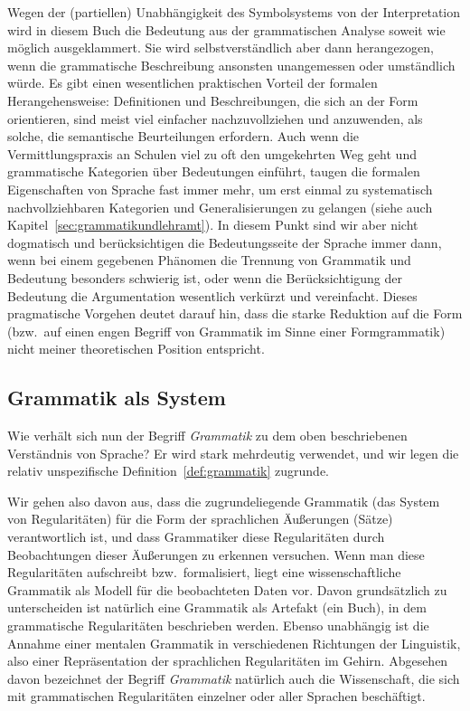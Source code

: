 Wegen der (partiellen) Unabhängigkeit des Symbolsystems von der Interpretation wird in diesem Buch die Bedeutung aus der grammatischen Analyse soweit wie möglich ausgeklammert.
Sie wird selbstverständlich aber dann herangezogen, wenn die grammatische Beschreibung ansonsten unangemessen oder umständlich würde.
Es gibt einen wesentlichen praktischen Vorteil der formalen Herangehensweise:
Definitionen und Beschreibungen, die sich an der Form orientieren, sind meist viel einfacher nachzuvollziehen und anzuwenden, als solche, die semantische Beurteilungen erfordern.
Auch wenn die Vermittlungspraxis an Schulen viel zu oft den umgekehrten Weg geht und grammatische Kategorien über Bedeutungen einführt, taugen die formalen Eigenschaften von Sprache fast immer mehr, um erst einmal zu systematisch nachvollziehbaren Kategorien und Generalisierungen zu gelangen (siehe auch Kapitel~\ref{sec:grammatikundlehramt}).
In diesem Punkt sind wir aber nicht dogmatisch und berücksichtigen die Bedeutungsseite der Sprache immer dann, wenn bei einem gegebenen Phänomen die Trennung von Grammatik und Bedeutung besonders schwierig ist, oder wenn die Berücksichtigung der Bedeutung die Argumentation wesentlich verkürzt und vereinfacht.
Dieses pragmatische Vorgehen deutet darauf hin, dass die starke Reduktion auf die Form (bzw.\ auf einen engen Begriff von Grammatik im Sinne einer Formgrammatik) nicht meiner theoretischen Position entspricht.

\subsection{Grammatik als System}
\label{sec:grammatikalssystem}

Wie verhält sich nun der Begriff \textit{Grammatik} zu dem oben beschriebenen Verständnis von Sprache?
Er wird stark mehrdeutig verwendet, und wir legen die relativ unspezifische Definition~\ref{def:grammatik} zugrunde.


Wir gehen also davon aus, dass die zugrundeliegende Grammatik (das System von Regularitäten) für die Form der sprachlichen Äußerungen (\zB Sätze) verantwortlich ist, und dass Grammatiker diese Regularitäten durch Beobachtungen dieser Äußerungen zu erkennen versuchen.
Wenn man diese Regularitäten aufschreibt bzw.\ formalisiert, liegt eine wissenschaftliche Grammatik als Modell für die beobachteten Daten vor.
Davon grundsätzlich zu unterscheiden ist natürlich eine Grammatik als Artefakt (\zB ein Buch), in dem grammatische Regularitäten beschrieben werden.
Ebenso unabhängig ist die Annahme einer mentalen Grammatik in verschiedenen Richtungen der Linguistik, also einer Repräsentation der sprachlichen Regularitäten im Gehirn.
Abgesehen davon bezeichnet der Begriff \textit{Grammatik} natürlich auch die Wissenschaft, die sich mit grammatischen Regularitäten einzelner oder aller Sprachen beschäftigt.

